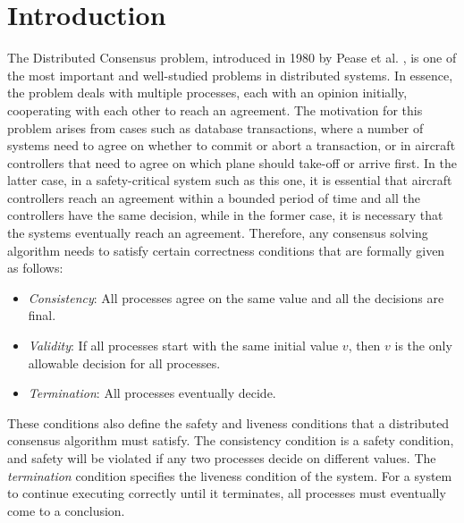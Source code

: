 ﻿\section{Introduction}

The Distributed Consensus problem, introduced in 1980 by Pease et al. \cite{PeaseSL80}, is one of the most important and well-studied problems in distributed systems. In essence, the problem deals with multiple processes, each with an opinion initially, cooperating with each other to reach an agreement. The motivation for this problem arises from cases such as database transactions, where a number of systems need to agree on whether to commit or abort a transaction, or in aircraft controllers that need to agree on which plane should take-off or arrive first. In the latter case, in a safety-critical system such as this one, it is essential that aircraft controllers reach an agreement within a bounded period of time and all the controllers have the same decision, while in the former case, it is necessary that the systems eventually reach an agreement. Therefore, any consensus solving algorithm needs to satisfy certain correctness conditions that are formally given as follows:

\begin{itemize}
    \item \textit{Consistency}: All processes agree on the same value and all the decisions are final.
    \item \textit{Validity}: If all processes start with the same initial value $v$, then $v$ is the only allowable decision for all processes.
    \item \textit{Termination}: All processes eventually decide.
\end{itemize}


These conditions also define the safety and liveness conditions that a distributed consensus algorithm must satisfy.  The consistency condition is a safety condition, and safety will be violated if any two processes decide on different values. The \textit{termination} condition specifies the liveness condition of the system. For a system to continue executing correctly until it terminates, all processes must eventually come to a conclusion.

